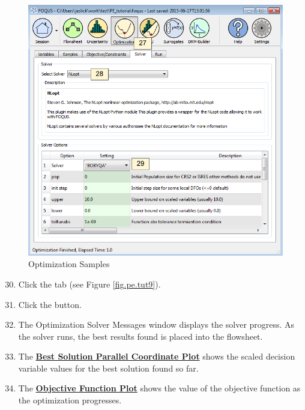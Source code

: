 \begin{figure}[H]
	\begin{center}
		\includegraphics[scale=0.55]{Chapt_optimization/figs/par_est_tut8}
		\caption{Optimization Samples}
		\label{fig.pe.tut8}
	\end{center}
\end{figure}

\begin{enumerate}
	\setcounter{enumi}{29}
	\item Click the  tab (see Figure \ref{fig.pe.tut9}).
	\item Click the  button.
	\item The Optimization Solver Messages window displays the solver progress. As the solver runs, the best results found is placed into the flowsheet.
	\item The \textbf{\underline{Best Solution Parallel Coordinate Plot}} shows the scaled decision variable values for the best solution found so far.
	\item The \textbf{\underline{Objective Function Plot}} shows the value of the objective function as the optimization progresses.
\end{enumerate}

